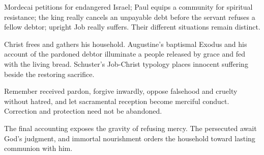 \begin{fourSenses}
\item[Literal.] Mordecai petitions for endangered Israel; Paul equips a
community for spiritual resistance; the king really cancels an unpayable
debt before the servant refuses a fellow debtor; upright Job really
suffers. Their different situations remain distinct.
\item[Allegorical.] Christ frees and gathers his household. Augustine's
baptismal Exodus and his account of the pardoned debtor illuminate a
people released by grace and fed with the living bread. Schuster's
Job-Christ typology places innocent suffering beside the restoring
sacrifice.
\item[Moral.] Remember received pardon, forgive inwardly, oppose falsehood
and cruelty without hatred, and let sacramental reception become merciful
conduct. Correction and protection need not be abandoned.
\item[Anagogical.] The final accounting exposes the gravity of refusing
mercy. The persecuted await God's judgment, and immortal nourishment
orders the household toward lasting communion with him.
\end{fourSenses}

\clearpage
